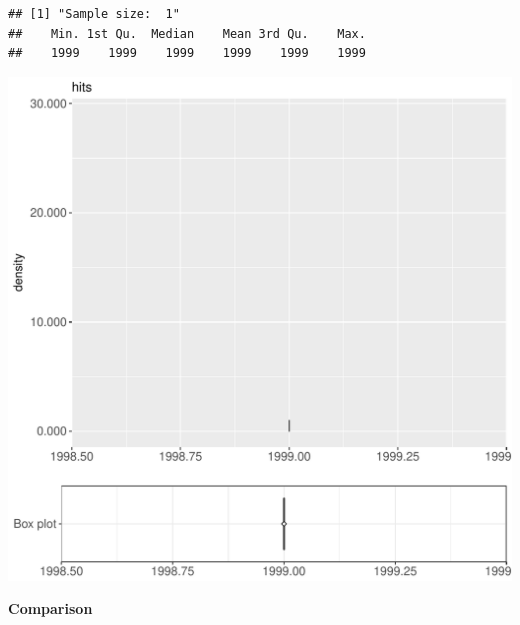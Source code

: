 \documentclass{article}\usepackage[]{graphicx}\usepackage[]{color}
\makeatletter
\def\maxwidth{ %
  \ifdim\Gin@nat@width>\linewidth
    \linewidth
  \else
    \Gin@nat@width
  \fi
}
\newenvironment{kframe}{%
 \def\at@end@of@kframe{}%
 \ifinner\ifhmode%
  \def\at@end@of@kframe{\end{minipage}}%
  \begin{minipage}{\columnwidth}%
 \fi\fi%
 \def\FrameCommand##1{\hskip\@totalleftmargin \hskip-\fboxsep
 \colorbox{shadecolor}{##1}\hskip-\fboxsep
     \hskip-\linewidth \hskip-\@totalleftmargin \hskip\columnwidth}%
 \MakeFramed {\advance\hsize-\width
   \@totalleftmargin\z@ \linewidth\hsize
   \@setminipage}}%
 {\par\unskip\endMakeFramed%
 \at@end@of@kframe}
\newenvironment{knitrout}{}{} %
\makeatother
\begin{document}
\begin{knitrout}
\color{fgcolor}\begin{kframe}
\begin{verbatim}
## [1] "Sample size:  1"
##    Min. 1st Qu.  Median    Mean 3rd Qu.    Max. 
##    1999    1999    1999    1999    1999    1999
\end{verbatim}


{\ttfamily\noindent\bfseries{}}\end{kframe}
\includegraphics[width=\maxwidth]{figure/RH3_trivialcaching_obscure-1} 

\end{knitrout}
  
 \textbf{Comparison}
  
\end{document}
